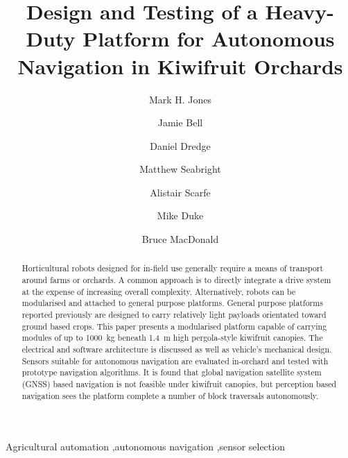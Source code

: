 \documentclass[preprint,authoryear,12pt]{elsarticle}
\begin{document}
\begin{frontmatter}

\title{Design and Testing of a Heavy-Duty Platform for Autonomous Navigation in Kiwifruit Orchards}

\author[UoW]{Mark H. Jones}

\author[UoA]{Jamie Bell}
\author[UoW]{Daniel Dredge}
\author[UoW]{Matthew Seabright}
\author[RPL]{Alistair Scarfe}
\author[UoW]{Mike Duke}
\author[UoA]{Bruce MacDonald}
\address[UoW]{School of Engineering, University of Waikato, Hamilton, New Zealand}
\address[UoA]{Faculty of Engineering, University of Auckland, Auckland, New Zealand}
\address[RPL]{Robotics Plus Ltd, Newnham Innovation Park, Tauranga, New Zealand}

\begin{abstract}
    Horticultural robots designed for in-field use generally require a means of transport around farms or orchards.
    A common approach is to directly integrate a drive system at the expense of increasing overall complexity.
    Alternatively, robots can be modularised and attached to general purpose platforms.
    General purpose platforms reported previously are designed to carry relatively light payloads orientated toward ground based crops.
    This paper presents a modularised platform capable of carrying modules of up to \SI{1000}{\kilo\gram} beneath \SI{1.4}{\meter} high pergola-style kiwifruit canopies.
    The electrical and software architecture is discussed as well as vehicle's mechanical design.
    Sensors suitable for autonomous navigation are evaluated in-orchard and tested with prototype navigation algorithms.
    It is found that global navigation satellite system (GNSS) based navigation is not feasible under kiwifruit canopies, but perception based navigation sees the platform complete a number of block traversals autonomously.


\end{abstract}

\begin{keyword}
    Agricultural automation \sep autonomous navigation \sep sensor selection
\end{keyword}

\end{frontmatter}

\linenumbers

\begin{table}
  \small
   \begin{framed}
     \printnomenclature
   \end{framed}
\end{table}
\end{document}
